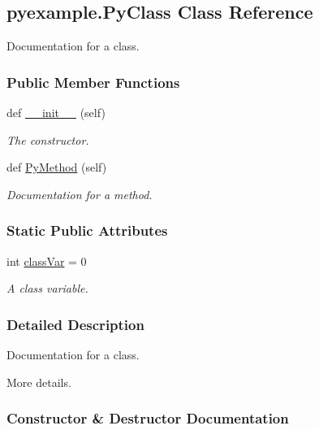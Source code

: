 \hypertarget{classpyexample_1_1PyClass}{}\subsection{pyexample.\+Py\+Class Class Reference}
\label{classpyexample_1_1PyClass}


Documentation for a class.  


\subsubsection*{Public Member Functions}
\begin{DoxyCompactItemize}
\item 
def \hyperlink{classpyexample_1_1PyClass_a87e20fe7e81cb5a1c04e620c076ab8ac}{\+\_\+\+\_\+init\+\_\+\+\_\+} (self)
\begin{DoxyCompactList}\small\item\em The constructor. \end{DoxyCompactList}\item 
def \hyperlink{classpyexample_1_1PyClass_a654596774eb28a0c6d26eea565de3a9d}{Py\+Method} (self)
\begin{DoxyCompactList}\small\item\em Documentation for a method. \end{DoxyCompactList}\end{DoxyCompactItemize}
\subsubsection*{Static Public Attributes}
\begin{DoxyCompactItemize}
\item 
int \hyperlink{classpyexample_1_1PyClass_abd17aff54e5b0ca194020c796c733546}{class\+Var} = 0
\begin{DoxyCompactList}\small\item\em A class variable. \end{DoxyCompactList}\end{DoxyCompactItemize}


\subsubsection{Detailed Description}
Documentation for a class. 

More details. 

\subsubsection{Constructor \& Destructor Documentation}
